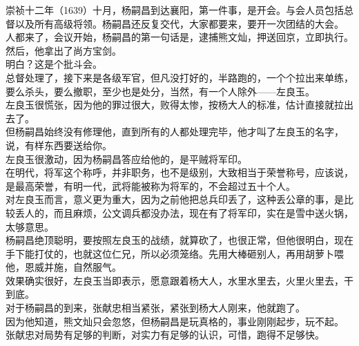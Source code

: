 \begin{multicols}{\theparacolNo}
崇祯十二年（1639）十月，杨嗣昌到达襄阳，第一件事，是开会。与会人员包括总督以及所有高级将领。杨嗣昌还反复交代，大家都要来，要开一次团结的大会。\\

人都来了，会议开始，杨嗣昌的第一句话是，逮捕熊文灿，押送回京，立即执行。\\

然后，他拿出了尚方宝剑。\\

明白？这是个批斗会。\\

总督处理了，接下来是各级军官，但凡没打好的，半路跑的，一个个拉出来单练，要么杀头，要么撤职，至少也是处分，当然，有一个人除外——左良玉。\\

左良玉很慌张，因为他的罪过很大，败得太惨，按杨大人的标准，估计直接就拉出去了。\\

但杨嗣昌始终没有修理他，直到所有的人都处理完毕，他才叫了左良玉的名字，说，有样东西要送给你。\\

左良玉很激动，因为杨嗣昌答应给他的，是平贼将军印。\\

在明代，将军这个称呼，并非职务，也不是级别，大致相当于荣誉称号，应该说，是最高荣誉，有明一代，武将能被称为将军的，不会超过五十个人。\\

对左良玉而言，意义更为重大，因为之前他把总兵印丢了，这种丢公章的事，是比较丢人的，而且麻烦，公文调兵都没办法，现在有了将军印，实在是雪中送火锅，太够意思。\\

杨嗣昌绝顶聪明，要按照左良玉的战绩，就算砍了，也很正常，但他很明白，现在手下能打仗的，也就这位仁兄，所以必须笼络。先用大棒砸别人，再用胡萝卜喂他，恩威并施，自然服气。\\

效果确实很好，左良玉当即表示，愿意跟着杨大人，水里水里去，火里火里去，干到底。\\

对于杨嗣昌的到来，张献忠相当紧张，紧张到杨大人刚来，他就跑了。\\

因为他知道，熊文灿只会忽悠，但杨嗣昌是玩真格的，事业刚刚起步，玩不起。\\

张献忠对局势有足够的判断，对实力有足够的认识，可惜，跑得不足够快。\\


\end{multicols}
